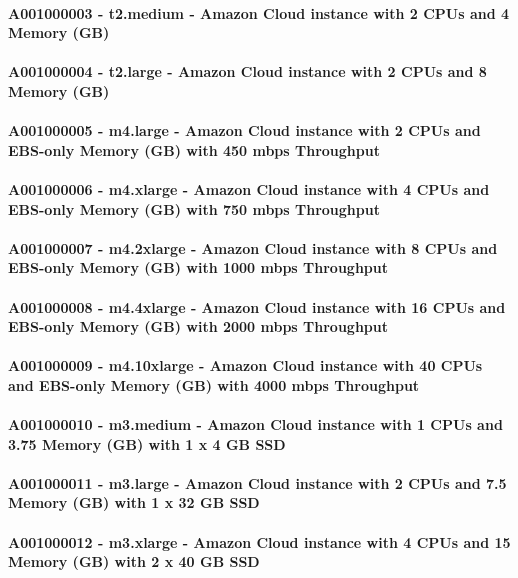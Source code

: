 \documentclass{acm_proc_article-sp}
\begin{document}
\paragraph{A001000003 - t2.medium - Amazon Cloud instance with 2 CPUs and 4 Memory (GB)}
\paragraph{A001000004 - t2.large - Amazon Cloud instance with 2 CPUs and 8 Memory (GB)}
\paragraph{A001000005 - m4.large - Amazon Cloud instance with 2 CPUs and EBS-only Memory (GB) with 450 mbps Throughput}
\paragraph{A001000006 - m4.xlarge - Amazon Cloud instance with 4 CPUs and EBS-only Memory (GB) with 750 mbps Throughput}
\paragraph{A001000007 - m4.2xlarge - Amazon Cloud instance with 8 CPUs and EBS-only Memory (GB) with 1000 mbps Throughput}
\paragraph{A001000008 - m4.4xlarge - Amazon Cloud instance with 16 CPUs and EBS-only Memory (GB) with 2000 mbps Throughput}
\paragraph{A001000009 - m4.10xlarge - Amazon Cloud instance with 40 CPUs and EBS-only Memory (GB) with 4000 mbps Throughput}
\paragraph{A001000010 - m3.medium - Amazon Cloud instance with 1 CPUs and 3.75 Memory (GB) with 1 x 4 GB SSD}
\paragraph{A001000011 - m3.large - Amazon Cloud instance with 2 CPUs and 7.5 Memory (GB) with 1 x 32 GB SSD}
\paragraph{A001000012 - m3.xlarge - Amazon Cloud instance with 4 CPUs and 15 Memory (GB) with 2 x 40 GB SSD}
\end{document}
